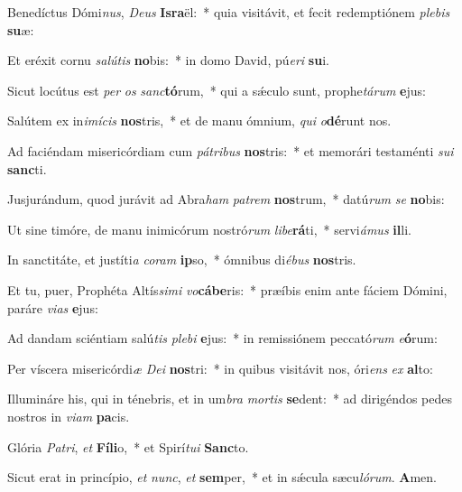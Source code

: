 \item Benedíctus Dómi\textit{nus}, \textit{Deus} \textbf{Is}\textbf{ra}ël:~* quia visitávit, et fecit redemptiónem \textit{plebis} \textbf{su}æ:

\item Et eréxit cornu \textit{salútis} \textbf{no}bis:~* in domo David, pú\textit{eri} \textbf{su}i.

\item Sicut locútus est \textit{per} \textit{os} \textit{sanc}\textbf{tó}rum,~* qui a sǽculo sunt, prophe\textit{tárum} \textbf{e}jus:

\item Salútem ex in\textit{imícis} \textbf{nos}tris,~* et de manu ómnium, \textit{qui} \textit{o}\textbf{dé}runt nos.

\item Ad faciéndam misericórdiam cum \textit{pátribus} \textbf{nos}tris:~* et memorári testaménti \textit{sui} \textbf{sanc}ti.

\item Jusjurándum, quod jurávit ad Abra\textit{ham} \textit{patrem} \textbf{nos}trum,~* datú\textit{rum} \textit{se} \textbf{no}bis:

\item Ut sine timóre, de manu inimicórum nostró\textit{rum} \textit{libe}\textbf{rá}ti,~* servi\textit{ámus} \textbf{il}li.

\item In sanctitáte, et justíti\textit{a} \textit{coram} \textbf{ip}so,~* ómnibus di\textit{ébus} \textbf{nos}tris.

\item Et tu, puer, Prophéta Altís\textit{simi} \textit{vo}\textbf{cá}\textbf{be}ris:~* præíbis enim ante fáciem Dómini, paráre \textit{vias} \textbf{e}jus:

\item Ad dandam sciéntiam salú\textit{tis} \textit{plebi} \textbf{e}jus:~* in remissiónem peccató\textit{rum} \textit{e}\textbf{ó}rum:

\item Per víscera misericórdi\textit{æ} \textit{Dei} \textbf{nos}tri:~* in quibus visitávit nos, óri\textit{ens} \textit{ex} \textbf{al}to:

\item Illumináre his, qui in ténebris, et in um\textit{bra} \textit{mortis} \textbf{se}dent:~* ad dirigéndos pedes nostros in \textit{viam} \textbf{pa}cis.

\item Glória \textit{Patri}, \textit{et} \textbf{Fí}\textbf{li}o,~* et Spirí\textit{tui} \textbf{Sanc}to.

\item Sicut erat in princípio, \textit{et} \textit{nunc}, \textit{et} \textbf{sem}per,~* et in sǽcula sæcu\textit{lórum}. \textbf{A}men.

